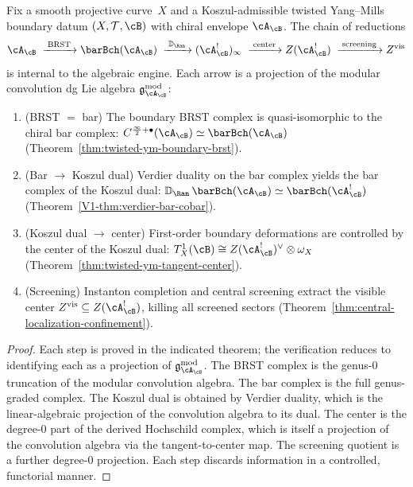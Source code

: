 \begin{theorem}
\label{thm:ym-bar-bridge}
Fix a smooth projective curve~$X$ and a Koszul-admissible twisted
Yang--Mills boundary datum $(X,\mathcal{T},\cB)$ with chiral
envelope $\cA_{\cB}$. The chain of reductions
\[
\cA_{\cB}
\;\xrightarrow{\;\text{BRST}\;}
\barBch(\cA_{\cB})
\;\xrightarrow{\;\mathbb{D}_{\Ran}\;}
(\cA_{\cB}^!)_\infty
\;\xrightarrow{\;\text{center}\;}
Z(\cA_{\cB}^!)
\;\xrightarrow{\;\text{screening}\;}
Z^{\mathrm{vis}}
\]
is internal to the algebraic engine. Each arrow is a projection of
the modular convolution dg Lie algebra
$\mathfrak{g}^{\mathrm{mod}}_{\cA_{\cB}}$:
\begin{enumerate}[label=\textup{(\roman*)}]
\item \textup{(BRST $=$ bar)}\quad
 The boundary BRST complex is quasi-isomorphic to the chiral bar
 complex:
 $C^{\frac{\infty}{2}+\bullet}(\cA_{\cB}) \simeq
 \barBch(\cA_{\cB})$
 \textup{(}Theorem~\textup{\ref{thm:twisted-ym-boundary-brst}}\textup{)}.
\item \textup{(Bar $\to$ Koszul dual)}\quad
 Verdier duality on the bar complex yields the bar complex of
 the Koszul dual:
 $\mathbb{D}_{\Ran}\,\barBch(\cA_{\cB}) \simeq
 \barBch(\cA_{\cB}^!)$
 \textup{(}Theorem~\textup{\ref{V1-thm:verdier-bar-cobar}}\textup{)}.
\item \textup{(Koszul dual $\to$ center)}\quad
 First-order boundary deformations are controlled by the center
 of the Koszul dual: $T^1_X(\cB) \cong Z(\cA_{\cB}^!)^\vee
 \otimes \omega_X$
 \textup{(}Theorem~\textup{\ref{thm:twisted-ym-tangent-center}}\textup{)}.
\item \textup{(Screening)}\quad
 Instanton completion and central screening extract the visible
 center $Z^{\mathrm{vis}} \subseteq Z(\cA_{\cB}^!)$, killing all
 screened sectors
 \textup{(}Theorem~\textup{\ref{thm:central-localization-confinement}}\textup{)}.
\end{enumerate}
\end{theorem}

\begin{proof}
Each step is proved in the indicated theorem; the verification reduces to identifying
each as a projection of $\mathfrak{g}^{\mathrm{mod}}_{\cA_{\cB}}$.
The BRST complex is the genus-$0$ truncation of the modular
convolution algebra. The bar complex is the full genus-graded
complex. The Koszul dual is obtained by Verdier duality, which is
the linear-algebraic projection of the convolution algebra to its
dual. The center is the degree-$0$ part of the derived Hochschild
complex, which is itself a projection of the convolution algebra
via the tangent-to-center map. The screening quotient is a further
degree-$0$ projection. Each step discards information in a
controlled, functorial manner.
\end{proof}

